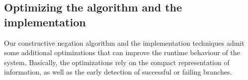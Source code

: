 \documentclass{llncs}
\begin{document}



\vspace{-0.1in}

\subsection{Optimizing the algorithm and the implementation}
\label{optimization}

Our constructive negation algorithm and the implementation techniques
admit some additional optimizations that can improve the runtime
behaviour of the system. Basically, the optimizations rely on the
compact representation of information, as well as the early detection
of successful or failing branches.
\end{document}
